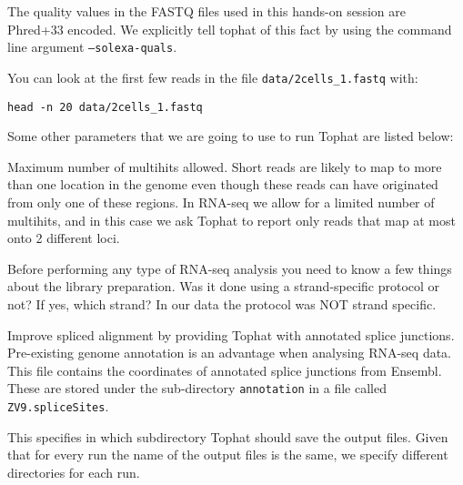 \begin{note}
The quality values in the FASTQ files used in this hands-on session are Phred+33
encoded. We explicitly tell tophat of this fact by using the command line
argument \texttt{--solexa-quals}.
\end{note}

\begin{information}
You can look at the first few reads in the file \texttt{data/2cells\_1.fastq} with:
 
\begin{lstlisting}
head -n 20 data/2cells_1.fastq
\end{lstlisting}
\end{information}

\begin{note}
Some other parameters that we are going to use to run Tophat are listed below:
\begin{description}[style=multiline,labelindent=0cm,align=right,leftmargin=\descriptionlabelspace,rightmargin=1.5cm,font=\ttfamily]
 \item[-g] Maximum number of multihits allowed. Short reads are likely to map to
 more than one location in the genome even though these reads can have originated
 from only one of these regions. In RNA-seq we allow for a limited number of
 multihits, and in this case we ask Tophat to report only reads that map at most
 onto 2 different loci.
 \item[--library-type] Before performing any type of RNA-seq analysis you need
 to know a few things about the library preparation. Was it done using a
 strand-specific protocol or not? If yes, which strand? In our data the protocol
 was NOT strand specific.
 \item[-j] Improve spliced alignment by providing Tophat with annotated splice
 junctions. Pre-existing genome annotation is an advantage when analysing RNA-seq
 data. This file contains the coordinates of annotated splice junctions from Ensembl.
 These are stored under the sub-directory \texttt{annotation} in a file called
 \texttt{ZV9.spliceSites}.
 \item[-o] This specifies in which subdirectory Tophat should save the output
 files. Given that for every run the name of the output files is the same, we
 specify different directories for each run.
\end{description}
\end{note}

